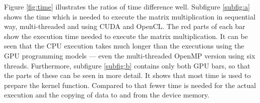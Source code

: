 Figure \ref{fig:time} illustrates the ratios of time difference well.
Subfigure \ref{subfig:a} shows the time which is needed to execute the matrix multiplication in sequential way, multi-threaded and using CUDA and OpenCL.
The red parts of each bar show the execution time needed to execute the matrix multiplication.
It can be seen that the CPU execution takes much longer than the executions using the GPU programming models --- even the multi-threaded OpenMP version using six threads.
Furthermore, subfigure \ref{subfig:b} contains only both GPU bars, so that the parts of these can be seen in more detail.
It shows that most time is used to prepare the kernel function.
Compared to that fewer time is needed for the actual execution and the copying of data to and from the device memory.
